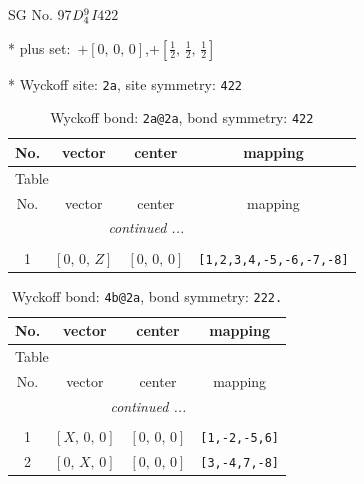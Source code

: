 \documentclass[fleqn,8pt]{jsarticle}
\begin{document}
\setcounter{MaxMatrixCols}{32}

\renewcommand{\tablename}{Table~}
\renewcommand{\figurename}{Figure~}
\begin{center}
\LARGE
SG No. 97\quad$D_{\rm 4}^{9}$\quad$I422$\quad[ tetragonal ]
\end{center}

* plus set:\,\,\,$+\left[ 0,\, 0,\, 0 \right]$,\quad $+\left[ \frac{1}{2},\, \frac{1}{2},\, \frac{1}{2} \right]$


* Wyckoff site: {\tt 2a}, site symmetry: {\tt 422}
\renewcommand{\arraystretch}{1.2}
\begin{longtable}{cccc}
\caption{Wyckoff bond: {\tt 2a@2a}, bond symmetry: {\tt 422}}
 \\
 \hline \hline
No. & vector & center & mapping \\ \hline \endfirsthead

\multicolumn{3}{l}{\tablename\ \thetable{}} \\
 \hline \hline
No. & vector & center & mapping \\ \hline \endhead

 \hline \hline
\multicolumn{3}{r}{\footnotesize\it continued ...} \\ \endfoot

 \hline \hline
\multicolumn{3}{r}{} \\ \endlastfoot

1 & $\left[ 0,\, 0,\, Z \right]$ & $\left[ 0,\, 0,\, 0 \right]$ & {\tt [1,2,3,4,-5,-6,-7,-8]} \\
\end{longtable}
\renewcommand{\arraystretch}{1.2}
\begin{longtable}{cccc}
\caption{Wyckoff bond: {\tt 4b@2a}, bond symmetry: {\tt 222.}}
 \\
 \hline \hline
No. & vector & center & mapping \\ \hline \endfirsthead

\multicolumn{3}{l}{\tablename\ \thetable{}} \\
 \hline \hline
No. & vector & center & mapping \\ \hline \endhead

 \hline \hline
\multicolumn{3}{r}{\footnotesize\it continued ...} \\ \endfoot

 \hline \hline
\multicolumn{3}{r}{} \\ \endlastfoot

1 & $\left[ X,\, 0,\, 0 \right]$ & $\left[ 0,\, 0,\, 0 \right]$ & {\tt [1,-2,-5,6]} \\ \hline
2 & $\left[ 0,\, X,\, 0 \right]$ & $\left[ 0,\, 0,\, 0 \right]$ & {\tt [3,-4,7,-8]} \\
\end{longtable}
\end{document}

